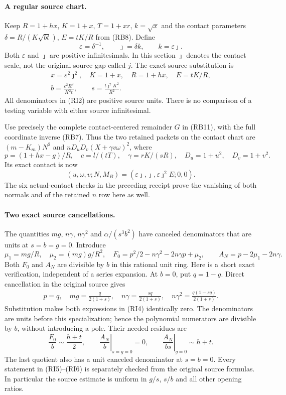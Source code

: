 \paragraph{A regular source chart.}
Keep $R=1+hx$, $K=1+x$, $T=1+xr$, $k=\sqrt{x}$ and the contact
parameters $\delta=R/(K\sqrt{bt})$, $E=tK/R$ from (RB8). Define
\[
 \varepsilon=\delta^{-1},\qquad \jmath=\delta k,
 \qquad k=\varepsilon\jmath.
 \tag{RI1}
\]
Both $\varepsilon$ and $\jmath$ are positive infinitesimals. In this
section $\jmath$ denotes the contact scale, not the original source
gap called $j$. The exact source substitution is
\[
 \begin{gathered}
 x=\varepsilon^2\jmath^2,\quad K=1+x,\quad R=1+hx,\quad
 E=tK/R,\\
 b=\frac{\varepsilon^2R^2}{K^2t},\qquad
 s=\frac{t\jmath^2K^2}{R^2}.
 \end{gathered}                                                   \tag{RI2}
\]
All denominators in (RI2) are positive source units. There is no
comparison of a testing variable with either source infinitesimal.

Use precisely the complete contact-centered remainder $G$ in (RB11),
with the full coordinate inverse (RB7). Thus the two retained packets
on the contact chart are $(m-K_m)N^2$ and
$nD_uD_v(X+\gamma v\omega)^2$, where
\[
 p=(1+hx-g)/R,\quad c=l/(tT),\quad
 \gamma=rK/(sR),\quad D_u=1+u^2,\quad D_v=1+v^2.
\]
Its exact contact is now
\[
 (u,\omega,v;N,M_B)
   =(\varepsilon\jmath,\jmath,\varepsilon\jmath^2E;0,0).
 \tag{RI3}
\]
The six actual-contact checks in the preceding receipt prove the
vanishing of both normals and of the retained $n$ row here as well.

\paragraph{Two exact source cancellations.}
The quantities $mg$, $n\gamma$, $n\gamma^2$ and
$\alpha/(s^3b^2)$ have canceled denominators that are units at
$s=b=g=0$. Introduce
\[
 \mu_1=mg/R,\quad \mu_2=(mg)g/R^2,\quad
 F_0=p^2/2-n\gamma^2-2n\gamma p+\mu_2,\qquad
 A_N=p-2\mu_1-2n\gamma.
 \tag{RI4}
\]
Both $F_0$ and $A_N$ are divisible by $b$ in this rational unit ring.
Here is a short exact verification, independent of a series expansion.
At $b=0$, put $q=1-g$. Direct cancellation in the original source gives
\[
 \begin{gathered}
 p=q,\quad mg=\frac{q}{2(1+s)},\quad
 n\gamma=\frac{sq}{2(1+s)},\quad
 n\gamma^2=\frac{q(1-sq)}{2(1+s)}.
 \end{gathered}                                                    \tag{RI5}
\]
Substitution makes both expressions in (RI4) identically zero.
The denominators are units before this specialization; hence the
polynomial numerators are divisible by $b$, without introducing a
pole. Their needed residues are
\[
 \frac{F_0}{b}\sim\frac{h+t}{2},\qquad
 \left.\frac{A_N}{b}\right|_{s=g=0}=0,\qquad
 \left.\frac{A_N}{bs}\right|_{g=0}\sim h+t.
 \tag{RI6}
\]
The last quotient also has a unit canceled denominator at $s=b=0$.
Every statement in (RI5)--(RI6) is separately checked from the original
source formulas. In particular the source estimate is uniform in
$g/s$, $s/b$ and all other opening ratios.

